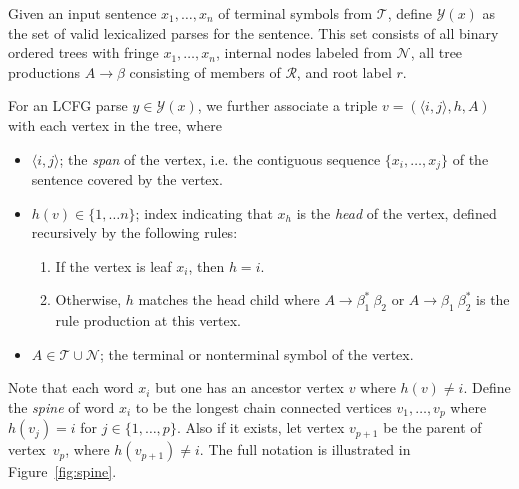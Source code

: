 \documentclass[11pt,letterpaper]{article}
\newcommand{\nonterms}{\mathcal{N}}
\newcommand{\rules}{\mathcal{R}}
\newcommand{\terms}{\mathcal{T}}
\newcommand{\Span}[1]{\langle #1 \rangle}
\newcommand{\Root}{r}
\newcommand{\RuleA}[3]{#1 \rightarrow #2^*\ #3}
\newcommand{\RuleB}[3]{#1 \rightarrow #2\ #3^*}
\begin{document}
Given an input sentence $x_1, \ldots, x_n$ of terminal symbols from $\terms$, define $\mathcal{Y}(x)$ as the set of valid lexicalized parses for the sentence. This set consists of all binary ordered trees with fringe $x_1, \ldots,  x_n$, internal nodes labeled from $\nonterms$, all tree productions  $A \rightarrow \beta$ consisting of members of $\rules$, and root label $\Root$.



For an LCFG parse $y \in \mathcal{Y}(x)$,
we further associate a triple $v = (\Span{i, j}, h, A)$ with each vertex in the tree, where


\begin{itemize}
\item $\Span{i,j}$; the \textit{span}  of the vertex, i.e. the contiguous sequence $\{x_i, \ldots, x_j\}$ of the sentence covered by the vertex.

\item $h(v) \in \{1, \ldots n\}$; index indicating that $x_h$ is the \textit{head} of the vertex, defined recursively by the following rules:
  \begin{enumerate}
  \item  If the vertex is leaf $x_i$, then $h=i$.
  \item Otherwise,  $h$ matches the head child where $\RuleA{A}{\beta_1}{\beta_2}$ or $\RuleB{A}{\beta_1}{\beta_2}$  is the rule production at this vertex.
  \end{enumerate}

\item $A \in \terms \cup \nonterms$; the terminal or nonterminal symbol of the vertex.
\end{itemize}

Note that each word $x_i$ but one has an ancestor vertex $v$ where $h(v) \neq i$.  Define the
\textit{spine} of word $x_i$ to be the longest chain connected vertices $v_1,
\ldots, v_p$ where $h(v_j) = i$ for $j \in \{1, \ldots, p\}$.
Also if it exists, let vertex $v_{p+1}$  be the parent of vertex~$v_p$,
where $h(v_{p+1}) \neq i$. The full notation is illustrated in Figure~\ref{fig:spine}.
\end{document}
